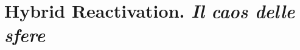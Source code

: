 \chapter{\label{ax:b-hybrid_reactivation_il_caos_delle_sfere}Hybrid Reactivation. \textit{Il caos delle sfere}}
